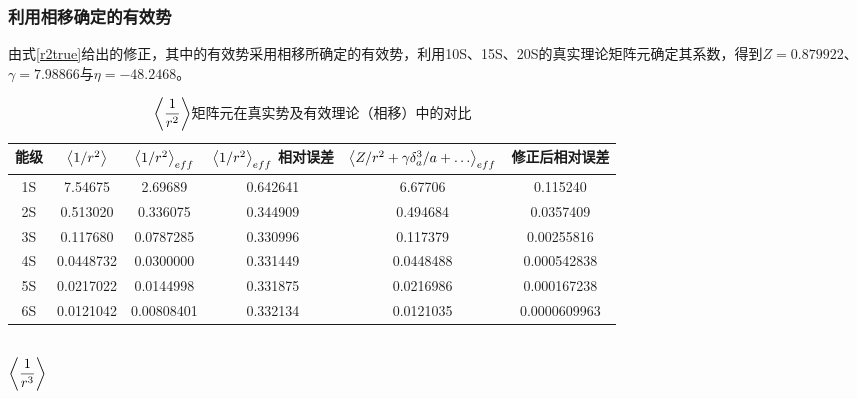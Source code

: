 \documentclass[hyperref,cs4size,titlepage,twoside]{ctexart}
\begin{document}
\subsubsection{利用相移确定的有效势}
由式\eqref{r2true}给出的修正，其中的有效势采用相移所确定的有效势，利用10S、15S、20S的真实理论矩阵元确定其系数，得到$Z=0.879922$、$\gamma=7.98866$与$\eta=-48.2468$。
\begin{table}[!hbtp]
  \centering
  \begin{tabular}{|cccccc|}
    \hline
    能级 & $\expval{1/r^2}$ & $\expval{1/r^2}_{eff}$ & $\expval{1/r^2}_{eff}$ 相对误差& $\expval{Z/r^2+\gamma \delta^3_a/a+\dots}_{eff}$ & 修正后相对误差 \\
    \hline
    1S & 7.54675 & 2.69689 &0.642641& 6.67706&0.115240 \\
    2S & 0.513020 & 0.336075 &0.344909& 0.494684&0.0357409 \\
    3S & 0.117680 & 0.0787285 &0.330996& 0.117379&0.00255816 \\
    4S & 0.0448732 & 0.0300000 &0.331449& 0.0448488&0.000542838 \\
    5S & 0.0217022 & 0.0144998 &0.331875& 0.0216986&0.000167238 \\
    6S & 0.0121042 & 0.00808401 &0.332134& 0.0121035&0.0000609963 \\
    \hline
  \end{tabular}
  \caption{$\displaystyle\expval{\frac{1}{r^2}}$矩阵元在真实势及有效理论（相移）中的对比}\label{evr21}
\end{table}
\subsection{$\displaystyle\expval{\frac{1}{r^3}}$}
\end{document}
